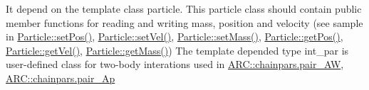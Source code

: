 It depend on the template class particle. This particle class should contain public member functions for reading and writing mass, position and velocity (see sample in \hyperlink{classParticle_a97d76b66aed57834c105b78b10643b81}{Particle\+::set\+Pos()}, \hyperlink{classParticle_a07c405254ac3f03854e7523ff473c828}{Particle\+::set\+Vel()}, \hyperlink{classParticle_a620f479862b90468a77da4e9cf5c0ff5}{Particle\+::set\+Mass()}, \hyperlink{classParticle_a4ec76421cddd91b1f27357fb182f6923}{Particle\+::get\+Pos()}, \hyperlink{classParticle_ab3d63df7f8c22f232b096ae33b6ea3ac}{Particle\+::get\+Vel()}, \hyperlink{classParticle_a2576aff503f68e78ced91406512b1255}{Particle\+::get\+Mass()}) The template depended type int\+\_\+par is user-\/defined class for two-\/body interations used in \hyperlink{classARC_1_1chainpars_a9558124278a55c0301642e1df63be063}{A\+R\+C\+::chainpars.\+pair\+\_\+\+AW}, \hyperlink{classARC_1_1chainpars_a80fcc6e3b5ce69025126bc49d90f233c}{A\+R\+C\+::chainpars.\+pair\+\_\+\+Ap}

